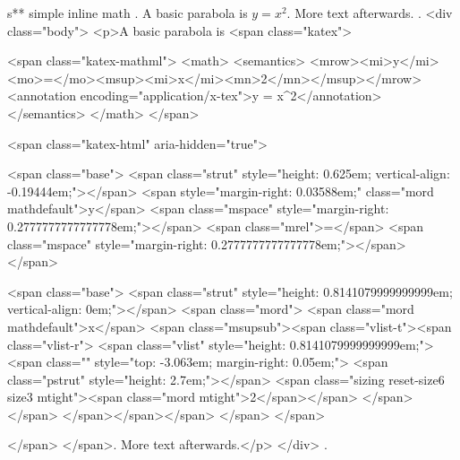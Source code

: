 s** simple inline math
.
A basic parabola is $y = x^2$. More text afterwards.
.
<div class="body">
<p>A basic parabola is <span class="katex">

<span class="katex-mathml">
<math>
<semantics>
<mrow><mi>y</mi><mo>=</mo><msup><mi>x</mi><mn>2</mn></msup></mrow>
<annotation encoding="application/x-tex">y = x^2</annotation>
</semantics>
</math>
</span>

<span class="katex-html" aria-hidden="true">

<span class="base">
<span class="strut" style="height: 0.625em; vertical-align: -0.19444em;"></span>
<span style="margin-right: 0.03588em;" class="mord mathdefault">y</span>
<span class="mspace" style="margin-right: 0.2777777777777778em;"></span>
<span class="mrel">=</span>
<span class="mspace" style="margin-right: 0.2777777777777778em;"></span>
</span>

<span class="base">
<span class="strut" style="height: 0.8141079999999999em; vertical-align: 0em;"></span>
<span class="mord">
<span class="mord mathdefault">x</span>
<span class="msupsub"><span class="vlist-t"><span class="vlist-r">
<span class="vlist" style="height: 0.8141079999999999em;">
<span class="" style="top: -3.063em; margin-right: 0.05em;">
<span class="pstrut" style="height: 2.7em;"></span>
<span class="sizing reset-size6 size3 mtight"><span class="mord mtight">2</span></span>
</span>
</span>
</span></span></span>
</span>
</span>

</span>
</span>. More text afterwards.</p>
</div>
.
